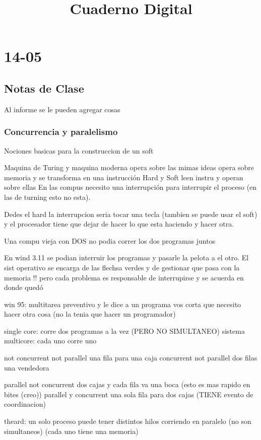 \documentclass[a4paper,12pt]{article}
\title{Cuaderno Digital}
\begin{document}
\maketitle
\section{14-05}
\subsection{Notas de Clase}
Al informe se le pueden agregar cosas
\subsubsection{Concurrencia y paralelismo}
Nociones basicas para la construccion de un soft

Maquina de Turing y maquina moderna opera sobre las mimas ideas opera sobre memoria y se transforma en una instrucción 
Hard y Soft leen instru y operan sobre ellas 
En las compus necesito una interrupción para interrupir el proceso (en las de turning esto no esta). 


Dedes el hard la interrupcion seria tocar una tecla (tambien se puede usar el soft) y el procesador tiene que dejar de hacer lo que esta haciendo y hacer otra. 

Una compu vieja con DOS no podia correr los dos programas juntos

En wind 3.11 se podian interruir los programas y pasarle la pelota a el otro. El sist operativo se encarga de las flechsa verdes y de gestionar que pasa con la memoria  !!
pero cada problema es responsable de interrupirse y se acuerda en donde quedó 

win 95: multitarea preventivo y le dice a un programa vos corta que necesito hacer otra cosa (no la tenia que hacer un programador)

single core: corre dos programas a la vez (PERO NO SIMULTANEO)
sistema multicore: cada uno corre uno

not concurrent not parallel una fila para una caja 
concurrent not parallel dos filas una vendedora 

parallel not concurrent dos cajas y cada fila va una boca (esto es mas rapido en bites (creo))
parallel y concurrent una sola fila para dos cajas (TIENE evento de coordinacion)

theard: un solo proceso puede tener distintos hilos corriendo en paralelo (no son simultaneos) (cada uno tiene una memoria) 
\end{document}
